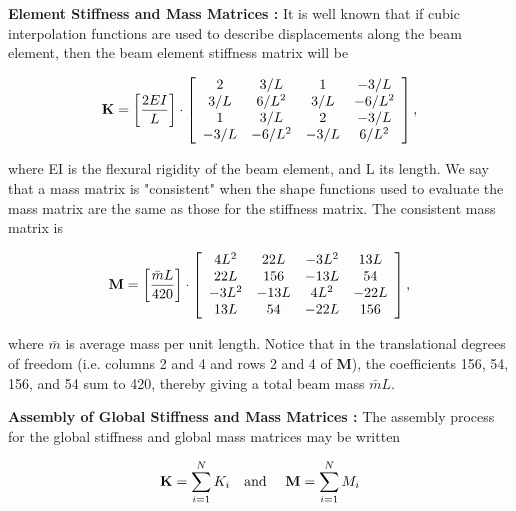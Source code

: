 \vspace{0.15 in}\noindent
{\bf Element Stiffness and Mass Matrices :}
It is well known that if cubic interpolation functions are used to describe
displacements along the beam element,
then the beam element stiffness matrix will be

\begin{equation}
{\bf K} = \left[ {2EI \over L} \right] \cdot \left [
\begin{array}{cccc}
           2   &    3/L   &    1   &   -3/L  \\
         3/L   &  6/L^2   &  3/L   & -6/L^2  \\
           1   &    3/L   &    2   &   -3/L  \\
        -3/L   & -6/L^2   & -3/L   &  6/L^2
\end{array} \right],
\end{equation}

\vspace{0.15 in}\noindent
where EI is the flexural rigidity of the beam element, and L its length.
We say that a mass matrix is "consistent" when the shape functions
used to evaluate the mass matrix are the same as those for the
stiffness matrix. The consistent mass matrix is

\begin{equation}
{\bf M} = \left[ {{{\bar m } L} \over 420} \right] \cdot \left [
\begin{array}{cccc}
         4L^2  &    22L   &  -3L^2 &    13L  \\
         22L   &    156   &   -13L &     54  \\
         -3L^2 &   -13L   &   4L^2 &   -22L  \\
         13L   &     54   &   -22L &    156
\end{array} \right],
\end{equation}

\vspace{0.15 in}\noindent
where ${\bar m}$ is average mass per unit length.
Notice that in the translational degrees of
freedom (i.e. columns 2 and 4 and rows 2 and 4 of {\bf M}),
the coefficients 156, 54, 156, and 54 sum to 420, thereby giving
a total beam mass ${\bar m}L$.

\vspace{0.15 in}\noindent
{\bf Assembly of Global Stiffness and Mass Matrices :}
The assembly process for the global stiffness and global mass matrices
may be written

\begin{equation}
{\bf K} = \sum_{i = 1}^{N} {K_i}
~~~\hbox{and}~~~~
{\bf M} = \sum_{i = 1}^{N} {M_i}
\end{equation}

